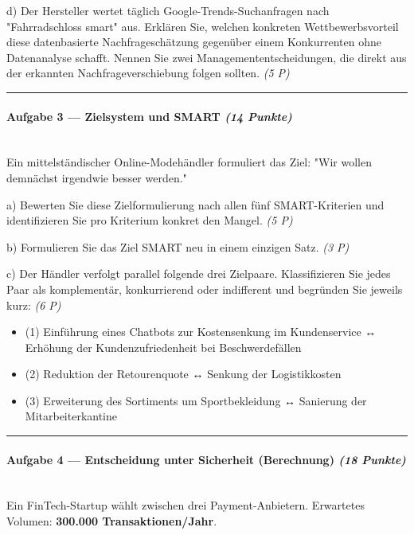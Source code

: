 \documentclass[11pt, a4paper]{article}
\begin{document}
d) Der Hersteller wertet täglich Google-Trends-Suchanfragen nach "Fahrradschloss smart" aus. Erklären Sie, welchen konkreten Wettbewerbsvorteil diese datenbasierte Nachfrageschätzung gegenüber einem Konkurrenten ohne Datenanalyse schafft. Nennen Sie zwei Managemententscheidungen, die direkt aus der erkannten Nachfrageverschiebung folgen sollten. \textit{(5 P)}



\noindent\textcolor{rulegray}{\rule{\linewidth}{0.4pt}}


\paragraph{Aufgabe 3 — Zielsystem und SMART \textit{(14 Punkte)}}\mbox{}\\[2pt]

Ein mittelständischer Online-Modehändler formuliert das Ziel: "Wir wollen demnächst irgendwie besser werden."


a) Bewerten Sie diese Zielformulierung nach allen fünf SMART-Kriterien und identifizieren Sie pro Kriterium konkret den Mangel. \textit{(5 P)}


b) Formulieren Sie das Ziel SMART neu in einem einzigen Satz. \textit{(3 P)}


c) Der Händler verfolgt parallel folgende drei Zielpaare. Klassifizieren Sie jedes Paar als komplementär, konkurrierend oder indifferent und begründen Sie jeweils kurz: \textit{(6 P)}

\begin{itemize}
  \item (1) Einführung eines Chatbots zur Kostensenkung im Kundenservice ↔ Erhöhung der Kundenzufriedenheit bei Beschwerdefällen
  \item (2) Reduktion der Retourenquote ↔ Senkung der Logistikkosten
  \item (3) Erweiterung des Sortiments um Sportbekleidung ↔ Sanierung der Mitarbeiterkantine
\end{itemize}


\noindent\textcolor{rulegray}{\rule{\linewidth}{0.4pt}}


\paragraph{Aufgabe 4 — Entscheidung unter Sicherheit (Berechnung) \textit{(18 Punkte)}}\mbox{}\\[2pt]

Ein FinTech-Startup wählt zwischen drei Payment-Anbietern. Erwartetes Volumen: \textbf{300.000 Transaktionen/Jahr}.
\end{document}
